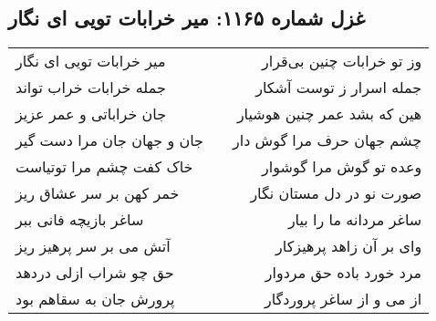 \begin{center}
\section*{غزل شماره ۱۱۶۵: میر خرابات تویی ای نگار}
\label{sec:1165}
\begin{longtable}{l p{0.5cm} r}
میر خرابات تویی ای نگار
&&
وز تو خرابات چنین بی‌قرار
\\
جمله خرابات خراب تواند
&&
جمله اسرار ز توست آشکار
\\
جان خراباتی و عمر عزیز
&&
هین که بشد عمر چنین هوشیار
\\
جان و جهان جان مرا دست گیر
&&
چشم جهان حرف مرا گوش دار
\\
خاک کفت چشم مرا توتیاست
&&
وعده تو گوش مرا گوشوار
\\
خمر کهن بر سر عشاق ریز
&&
صورت نو در دل مستان نگار
\\
ساغر بازیچه فانی ببر
&&
ساغر مردانه ما را بیار
\\
آتش می بر سر پرهیز ریز
&&
وای بر آن زاهد پرهیزکار
\\
حق چو شراب ازلی دردهد
&&
مرد خورد باده حق مردوار
\\
پرورش جان به سقاهم بود
&&
از می و از ساغر پروردگار
\\
\end{longtable}
\end{center}
